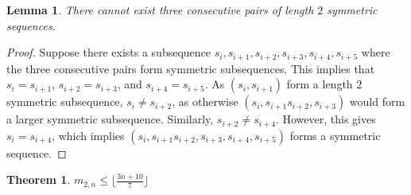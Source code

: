 \documentclass[12pt]{article}
\newtheorem{theorem}{Theorem}
\theoremstyle{plain}
\newtheorem{lemma}[thm]{Lemma}
\theoremstyle{definition}
\theoremstyle{remark}
\theoremstyle{definition}
\begin{document}
\begin{lemma}\label{no three pairs}
    There cannot exist three consecutive pairs of length $2$ symmetric sequences.
\end{lemma}

\begin{proof}
    Suppose there exists a subsequence $s_{i}, s_{i+1}, s_{i+2}, s_{i+3}, s_{i+4}, s_{i+5}$ where the three consecutive pairs form symmetric subsequences.  This implies that $s_{i}= s_{i+1}$, $s_{i+2}= s_{i+3}$, and $s_{i+4}= s_{i+5}$. As $(s_{i}, s_{i+1})$ form a length $2$ symmetric subsequence, $s_{i}\neq s_{i+2}$, as otherwise $(s_{i}, s_{i+1} s_{i+2}, s_{i+3})$ would form a larger symmetric subsequence. Similarly, $s_{i+2}\neq s_{i+4}$. However, this gives $s_{i}=s_{i+4}$, which implies $(s_{i}, s_{i+1} s_{i+2}, s_{i+3}, s_{i+4}, s_{i+5})$ forms a symmetric sequence.
\end{proof}

\begin{theorem}
    $m_{2,n} \leq \lfloor\frac{3n+10}{7}\rfloor$
\end{theorem}
\end{document}
